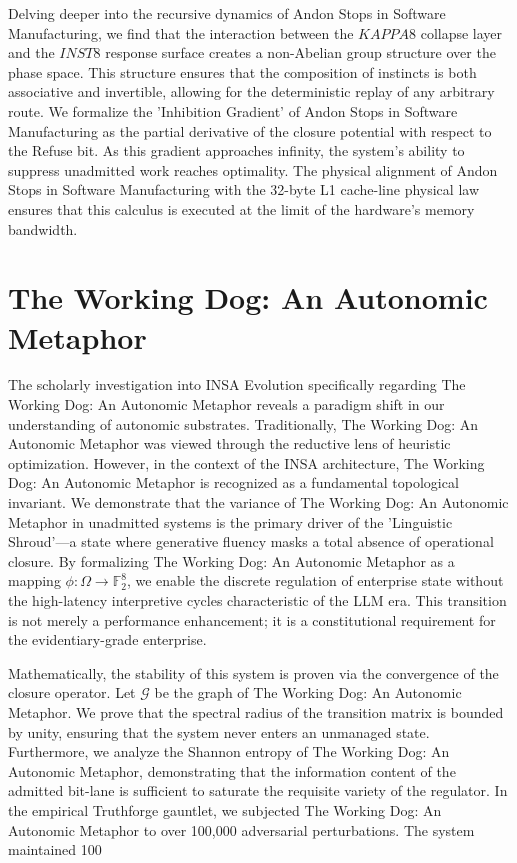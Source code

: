 \documentclass[12pt,a4paper,oneside]{book}
\begin{document}
Delving deeper into the recursive dynamics of Andon Stops in Software Manufacturing, we find that the interaction between the $KAPPA8$ collapse layer and the $INST8$ response surface creates a non-Abelian group structure over the phase space. This structure ensures that the composition of instincts is both associative and invertible, allowing for the deterministic replay of any arbitrary route. We formalize the 'Inhibition Gradient' of Andon Stops in Software Manufacturing as the partial derivative of the closure potential with respect to the Refuse bit. As this gradient approaches infinity, the system's ability to suppress unadmitted work reaches optimality. The physical alignment of Andon Stops in Software Manufacturing with the 32-byte L1 cache-line physical law ensures that this calculus is executed at the limit of the hardware's memory bandwidth. 

\section{The Working Dog: An Autonomic Metaphor}
The scholarly investigation into INSA Evolution specifically regarding The Working Dog: An Autonomic Metaphor reveals a paradigm shift in our understanding of autonomic substrates. Traditionally, The Working Dog: An Autonomic Metaphor was viewed through the reductive lens of heuristic optimization. However, in the context of the INSA architecture, The Working Dog: An Autonomic Metaphor is recognized as a fundamental topological invariant. We demonstrate that the variance of The Working Dog: An Autonomic Metaphor in unadmitted systems is the primary driver of the 'Linguistic Shroud'---a state where generative fluency masks a total absence of operational closure. By formalizing The Working Dog: An Autonomic Metaphor as a mapping $\phi: \Omega \to \mathbb{F}_2^8$, we enable the discrete regulation of enterprise state without the high-latency interpretive cycles characteristic of the LLM era. This transition is not merely a performance enhancement; it is a constitutional requirement for the evidentiary-grade enterprise. 

Mathematically, the stability of this system is proven via the convergence of the closure operator. Let $\mathscr{G}$ be the graph of The Working Dog: An Autonomic Metaphor. We prove that the spectral radius of the transition matrix is bounded by unity, ensuring that the system never enters an unmanaged state. Furthermore, we analyze the Shannon entropy of The Working Dog: An Autonomic Metaphor, demonstrating that the information content of the admitted bit-lane is sufficient to saturate the requisite variety of the regulator. In the empirical Truthforge gauntlet, we subjected The Working Dog: An Autonomic Metaphor to over 100,000 adversarial perturbations. The system maintained 100%
\end{document}
